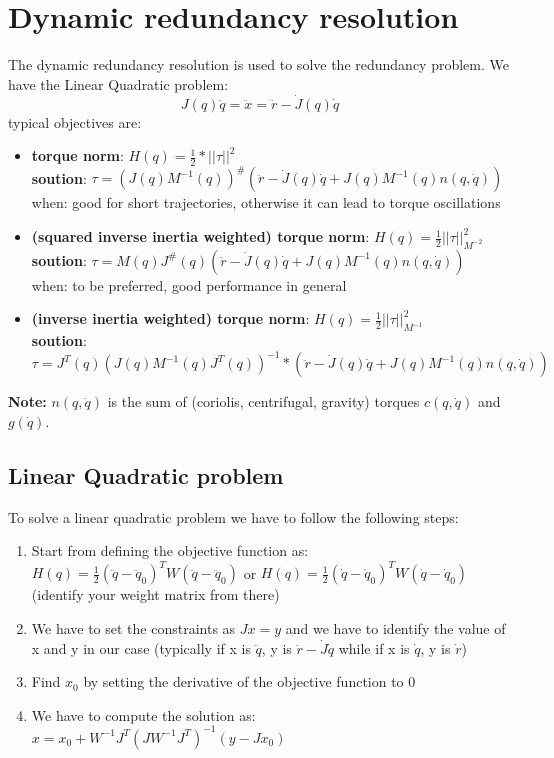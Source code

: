 \documentclass[a4paper,12pt]{article}
\begin{document}
\section{Dynamic redundancy resolution}
The dynamic redundancy resolution is used to solve the redundancy problem.
We have the Linear Quadratic problem:
\begin{equation}
    J(q) \ddot{q} = \ddot{x}= \ddot{r}-\dot{J}(q)\dot{q}
\end{equation}
typical objectives are:
\begin{itemize}
    \item \textbf{torque norm}: $H(q)=\frac{1}{2}*||\tau||^2$\\
    \textbf{soution}: $\tau= (J(q)M^{-1}(q))^{\#}(\ddot{r}-\dot{J}(q)\dot{q}+J(q)M^{-1}(q)n(q,\dot{q}))$\\
    when: good for short trajectories, otherwise it can lead to torque oscillations
    \item \textbf{(squared inverse inertia weighted) torque norm}: $H(q)=\frac{1}{2} ||\tau||^2_{ M^{-2}}$\\
    \textbf{soution}: $\tau= M(q)J^{\#}(q)(\ddot{r}-\dot{J}(q)\dot{q}+J(q)M^{-1}(q)n(q,\dot{q}))$\\
    when: to be preferred, good performance in general
    \item \textbf{(inverse inertia weighted) torque norm}: $H(q)=\frac{1}{2} ||\tau||^2_{ M^{-1}}$\\
    \textbf{soution}: $\tau= J^T(q)(J(q)M^{-1}(q)J^T(q))^{-1}*(\ddot{r}-\dot{J}(q)\dot{q}+J(q)M^{-1}(q)n(q,\dot{q}))$
\end{itemize}
\textbf{Note:} $n(q,\dot{q})$ is the sum of (coriolis, centrifugal, gravity) torques $c(q,\dot{q})$ and $g(\dot{q})$.
\subsection{Linear Quadratic problem}
To solve a linear quadratic problem we have to follow the following steps:
\begin{enumerate}
    \item Start from defining the objective function as: $H(q)=\frac{1}{2}(\ddot{q}-\ddot{q}_0)^T W (\ddot{q}-\ddot{q}_0)$
     or $H(q)=\frac{1}{2}(\dot{q}-\dot{q}_0)^T W (\dot{q}-\dot{q}_0)$ (identify your weight matrix from there)
     \item We have to set the constraints as $Jx=y$ and we have to identify 
        the value of x and y in our case (typically if x is $\ddot{q}$, y is $\ddot{r}-\dot{J}\dot{q}$
         while if x is $\dot{q}$, y is $\dot{r}$)
    \item Find $x_0$ by setting the derivative of the objective function to 0
    \item We have to compute the solution as: $x = x_0 + W^{-1}J^T(JW^{-1}J^T)^{-1}(y-Jx_0)$
\end{enumerate}
\end{document}
